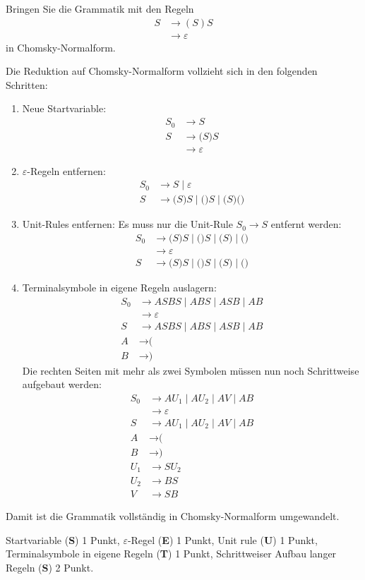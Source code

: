 Bringen Sie die Grammatik mit den Regeln
\begin{align*}
S&\rightarrow (S)S
\\
 &\rightarrow \varepsilon
\end{align*}
in Chomsky-Normalform.

\begin{loesung}
Die Reduktion auf Chomsky-Normalform vollzieht sich in den folgenden Schritten:
\begin{enumerate}
\item
Neue Startvariable:
\begin{align*}
S_0&\rightarrow S
\\
S&\rightarrow \texttt{(}S\texttt{)}S
\\
 &\rightarrow \varepsilon
\end{align*}
\item
$\varepsilon$-Regeln entfernen:
\begin{align*}
S_0&\rightarrow S \;|\; \varepsilon
\\
S&\rightarrow \texttt{(}S\texttt{)}S \;|\; \texttt{(}\texttt{)}S \;|\;
  \texttt{(}S\texttt{)} \texttt{(}\texttt{)}
\end{align*}
\item
Unit-Rules entfernen: Es muss nur die Unit-Rule $S_0\to S$ entfernt
werden:
\begin{align*}
S_0& \rightarrow \texttt{(}S)S \;|\; \texttt{(})S \;|\; \texttt{(}S) \;|\;
	\texttt{(})
\\
   &\rightarrow \varepsilon
\\
S&\rightarrow \texttt{(}S\texttt{)}S \;|\; \texttt{(}\texttt{)}S \;|\;
	\texttt{(}S\texttt{)} \;|\; \texttt{(}\texttt{)}
\end{align*}
\item Terminalsymbole in eigene Regeln auslagern:
\begin{align*}
S_0& \rightarrow ASBS \;|\; ABS \;|\; ASB \;|\; AB
\\
   &\rightarrow \varepsilon
\\
S&\rightarrow ASBS \;|\; ABS \;|\; ASB \;|\; AB
\\
A&\rightarrow \texttt{(}
\\
B&\rightarrow \texttt{)}
\end{align*}
Die rechten Seiten mit mehr als zwei Symbolen müssen nun noch Schrittweise
aufgebaut werden:
\begin{align*}
S_0& \rightarrow AU_1 \;|\; AU_2 \;|\; AV \;|\; AB
\\
   &\rightarrow \varepsilon
\\
S&\rightarrow AU_1 \;|\; AU_2 \;|\; AV \;|\; AB
\\
A&\rightarrow \texttt{(}
\\
B&\rightarrow \texttt{)}
\\
U_1&\rightarrow SU_2\\
U_2&\rightarrow BS\\
V  &\rightarrow SB
\end{align*}
\end{enumerate}
Damit ist die Grammatik vollständig in Chomsky-Normalform umgewandelt.
\end{loesung}

\begin{bewertung}
Startvariable ({\bf S}) 1 Punkt,
$\varepsilon$-Regel ({\bf E}) 1 Punkt,
Unit rule ({\bf U}) 1 Punkt,
Terminalsymbole in eigene Regeln ({\bf T}) 1 Punkt,
Schrittweiser Aufbau langer Regeln ({\bf S}) 2 Punkt.
\end{bewertung}

